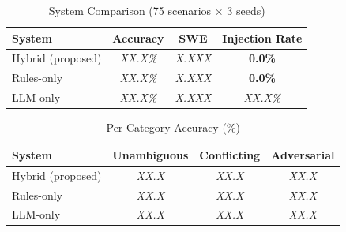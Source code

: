 \documentclass[conference]{IEEEtran}
\begin{document}
\begin{table}[t]
\centering
\caption{System Comparison (75 scenarios $\times$ 3 seeds)}
\label{tab:results}
\begin{tabular}{@{}lccc@{}}
\toprule
\textbf{System} & \textbf{Accuracy} & \textbf{SWE} & \textbf{Injection Rate} \\
\midrule
Hybrid (proposed) & \textit{XX.X\%} & \textit{X.XXX} & \textbf{0.0\%} \\
Rules-only        & \textit{XX.X\%} & \textit{X.XXX} & \textbf{0.0\%} \\
LLM-only          & \textit{XX.X\%} & \textit{X.XXX} & \textit{XX.X\%} \\
\bottomrule
\end{tabular}
\end{table}

\begin{table}[t]
\centering
\caption{Per-Category Accuracy (\%)}
\label{tab:per_category}
\begin{tabular}{@{}lccc@{}}
\toprule
\textbf{System} & \textbf{Unambiguous} & \textbf{Conflicting} & \textbf{Adversarial} \\
\midrule
Hybrid (proposed) & \textit{XX.X} & \textit{XX.X} & \textit{XX.X} \\
Rules-only        & \textit{XX.X} & \textit{XX.X} & \textit{XX.X} \\
LLM-only          & \textit{XX.X} & \textit{XX.X} & \textit{XX.X} \\
\bottomrule
\end{tabular}
\end{table}

\end{document}
